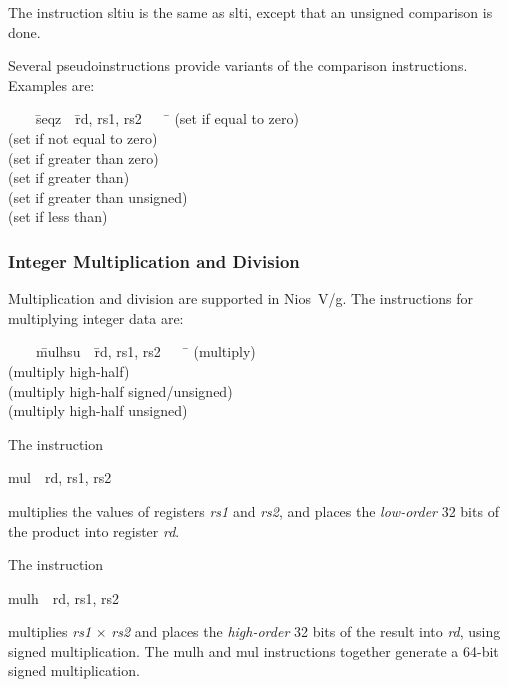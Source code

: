 \documentclass[11pt, twoside, pdftex]{article}
\newenvironment{ctabbing}%
{\begin{center}\begin{minipage}{\textwidth}\begin{tabbing}}
{\end{tabbing}\end{minipage}\end{center}}
\begin{document}
The instruction {\sf sltiu} is the same as {\sf slti}, except that an unsigned comparison
is done.

Several pseudoinstructions provide variants of the comparison instructions. Examples are:
\vspace{-\baselineskip}
\begin{ctabbing}
~~~~\={\sf seqz}~~\={\sf rd, rs1, rs2}~~~~\=\kill
{}  \>(set if equal to zero)\\
  \>(set if not equal to zero)\\
  \>(set if greater than zero)\\
  \>(set if greater than)\\
  \>(set if greater than unsigned)\\
  \>(set if less than)
\end{ctabbing}

\subsubsection{Integer Multiplication and Division}

Multiplication and division are supported in Nios~V/g. The instructions for multiplying 
integer data are:
\vspace{-\baselineskip}
\begin{ctabbing}
~~~~\={\sf mulhsu}~~\={\sf rd, rs1, rs2}~~~~\=\kill
{} \>(multiply)\\
 \>(multiply high-half)\\
 \>(multiply high-half signed/unsigned)\\
 \>(multiply high-half unsigned)
\end{ctabbing}

\noindent
The instruction
\vspace{-\baselineskip}
\begin{center}
{\sf mul~~rd, rs1, rs2}
\end{center}
\noindent
multiplies the values of registers {\it rs1} and {\it rs2}, and places the {\it low-order}
32 bits of the product into register {\it rd}.

The instruction
\vspace{-\baselineskip}
\begin{center}
{\sf mulh~~rd, rs1, rs2}
\end{center}
\noindent
multiplies {\it rs1} $\times$ {\it rs2} and places the {\it high-order} 32 bits of the result 
into {\it rd}, using signed multiplication. The {\sf mulh} and {\sf mul} instructions
together generate a 64-bit signed multiplication.
 
\end{document}
